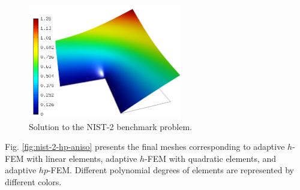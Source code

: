 \documentclass[12pt]{elsarticle}
\begin{document}
\begin{figure}[H]
\centering
\vspace{-3mm}
\includegraphics[height=5cm]{nist/nist-2/solution.png}
\vspace{-3mm}
\caption{Solution to the NIST-2 benchmark problem.}
\label{fig:sln-nist02}
\end{figure}


Fig. \ref{fig:nist-2-hp-aniso} presents the final meshes corresponding to adaptive $h$-FEM with 
linear elements, adaptive $h$-FEM with quadratic elements, and adaptive $hp$-FEM. Different 
polynomial degrees of elements are represented by different colors. 
\end{document}
